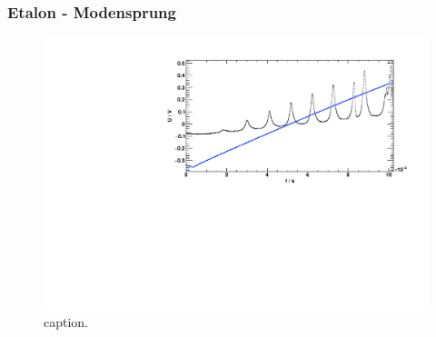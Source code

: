 \begin{frame}
\frametitle{Etalon - Modensprung}

\begin{figure}[H]
\begin{center}
  \includegraphics[width=\textwidth]{../img/up-etalon_zoom.pdf}
  \caption{caption.}
\end{center}
\end{figure}


\end{frame}
